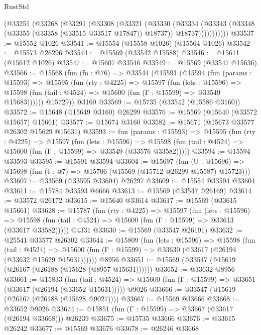 \begin{lexlean}{RustStd}
\begin{coremodule}
          (@33251
            (@33268
              (@33291
                (@33308
                  (@33321
                    (@33330
                      (@33334
                        (@33343
                          (@33348 (@33355 (@33358 (@33515 @33517 @17847)) @18737))
                          @18737)))))))))))
@33537 := @15552 @1026
@33541 := @15554 (@15558 @1026) (@15564 @1026)
@33542 := @15573 @26296
@33544 := @15569 (@33542 @15588)
@33546 := @15611 (@15612 @1026)
@33547 := @15607 @33546
@33549 := @15569 (@33547 @15636)
@33566 := @15568
    (fun (fn : @76) =>
    @33544
      (@15591
        (@15594
          (fun (params : @15593) =>
          @15595
            (fun (rty : @4225) =>
            @15597
              (fun (lets : @15596) =>
              @15598 (fun (tail : @4524) => @15600 (fun (Γ : @15599) => @33549 @15683))))))
        @15729))
    @3160
@33569 := @15735 (@33542 (@15586 @3160))
@33572 := @15648 (@15649 @3160) @26299
@33576 := @15569 (@15640 (@33572 @15657) @15661)
@33577 := @15674 @3160
@33582 := @15671 (@15673 @33577 @26302 @15629 @15631)
@33593 := fun (params : @15593) =>
  @15595
    (fun (rty : @4225) =>
    @15597
      (fun (lets : @15596) =>
      @15598 (fun (tail : @4524) => @15600 (fun (Γ : @15599) => @33549 (@33576 @33582)))))
@33594 := @15594 @33593
@33595 := @15591 @33594
@33604 := @15697
    (fun (U : @15696) => @15698 (fun (t : @7) => @15706 (@15569 (@15712 @26299 @15587) @15723)))
@33607 := @33569 (@33595 @33604) @26297
@33609 := @15554 @33594 @33604
@33611 := @15784 @33593 @6666
@33613 := @15569 (@33547 @26169)
@33614 := @33572 @26172
@33615 := @15640 @33614
@33617 := @15569 (@33615 @15661)
@33628 := @15787
    (fun (rty : @4225) =>
    @15597
      (fun (lets : @15596) =>
      @15598 (fun (tail : @4524) => @15600 (fun (Γ : @15599) => @33613 (@33617 @33582)))))
    @4331
@33630 := @15569 (@33547 @26191)
@33632 := @25541 @33577 @26302
@33644 := @15809
    (fun (lets : @15596) =>
    @15598
      (fun (tail : @4524) =>
      @15600 (fun (Γ : @15599) => @33630 (@33617 (@26194 (@33632 @15629 @15631))))))
    @8956
@33651 := @15569 (@33547 (@15619 (@26167 (@26188 (@15628 (@8957 @15631))))))
@33652 := @33632 @8956
@33661 := @15833
    (fun (tail : @4524) => @15600 (fun (Γ : @15599) => @33651 (@33617 (@26194 (@33652 @15631)))))
    @9026
@33666 := @33547 (@15619 (@26167 (@26188 (@15628 @9027))))
@33667 := @15569 @33666
@33668 := @33652 @9026
@33674 := @15851 (fun (Γ : @15599) => @33667 (@33617 (@26194 @33668))) @26239
@33675 := @15735 @33666
@33676 := @33615 @26242
@33677 := @15569 @33676
@33678 := @26246 @33668

\end{coremodule}
\end{lexlean}
